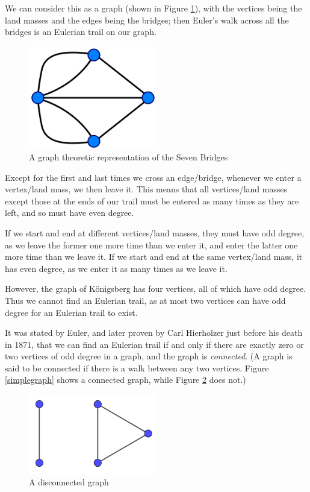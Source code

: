 \documentclass{article}
\begin{document}
	We can consider this as a graph (shown in Figure \ref{Konigsberggraph}), with the vertices being the land masses and the edges being the bridges; then Euler's walk across all the bridges is an Eulerian trail on our graph.
	
	\begin{figure}[h]
		\centering
		\includegraphics[width=0.5\textwidth]{Konigsberggraph}
		\caption{A graph theoretic representation of the Seven Bridges}
		\label{Konigsberggraph}
	\end{figure}
	
	Except for the first and last times we cross an edge/bridge, whenever we enter a vertex/land mass, we then leave it. This means that all vertices/land masses except those at the ends of our trail must be entered as many times as they are left, and so must have even degree.
	
	If we start and end at different vertices/land masses, they must have odd degree, as we leave the former one more time than we enter it, and enter the latter one more time than we leave it. If we start and end at the same vertex/land mass, it has even degree, as we enter it as many times as we leave it.
	
	However, the graph of K\"onigsberg has four vertices, all of which have odd degree. Thus we cannot find an Eulerian trail, as at most two vertices can have odd degree for an Eulerian trail to exist.
	
	It was stated by Euler, and later proven by Carl Hierholzer just before his death in 1871, that we can find an Eulerian trail if and only if there are exactly zero or two vertices of odd degree in a graph, and the graph is \textit{connected}. (A graph is said to be connected if there is a walk between any two vertices. Figure \ref{simplegraph} shows a connected graph, while Figure \ref{disconnectedgraph} does not.)
	
	\begin{figure}[h]
		\centering
		\includegraphics[width=0.5\textwidth]{disconnectedgraph}
		\caption{A disconnected graph}
		\label{disconnectedgraph}
	\end{figure}
	
\end{document}
